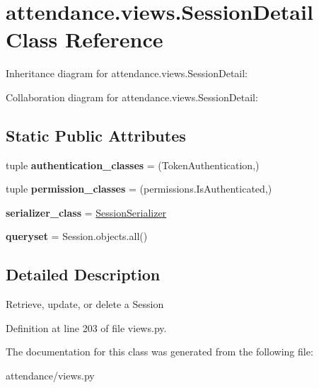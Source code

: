 \hypertarget{classattendance_1_1views_1_1_session_detail}{}\section{attendance.\+views.\+Session\+Detail Class Reference}
\label{classattendance_1_1views_1_1_session_detail}


Inheritance diagram for attendance.\+views.\+Session\+Detail\+:


Collaboration diagram for attendance.\+views.\+Session\+Detail\+:
\subsection*{Static Public Attributes}
\begin{DoxyCompactItemize}
\item 
\hypertarget{classattendance_1_1views_1_1_session_detail_add50980a6126e4108abdfcc8ae552d64}{}\label{classattendance_1_1views_1_1_session_detail_add50980a6126e4108abdfcc8ae552d64} 
tuple {\bfseries authentication\+\_\+classes} = (Token\+Authentication,)
\item 
\hypertarget{classattendance_1_1views_1_1_session_detail_ac02bcabc6d18ad907e1f832f013dd635}{}\label{classattendance_1_1views_1_1_session_detail_ac02bcabc6d18ad907e1f832f013dd635} 
tuple {\bfseries permission\+\_\+classes} = (permissions.\+Is\+Authenticated,)
\item 
\hypertarget{classattendance_1_1views_1_1_session_detail_aafa042242f9b8fddc8fa36bc0e90eac3}{}\label{classattendance_1_1views_1_1_session_detail_aafa042242f9b8fddc8fa36bc0e90eac3} 
{\bfseries serializer\+\_\+class} = \hyperlink{classattendance_1_1serializers_1_1_session_serializer}{Session\+Serializer}
\item 
\hypertarget{classattendance_1_1views_1_1_session_detail_a31eab3884081ee70d4ef8e1bf1c888f5}{}\label{classattendance_1_1views_1_1_session_detail_a31eab3884081ee70d4ef8e1bf1c888f5} 
{\bfseries queryset} = Session.\+objects.\+all()
\end{DoxyCompactItemize}


\subsection{Detailed Description}
\begin{DoxyVerb}Retrieve, update, or delete a Session
\end{DoxyVerb}
 

Definition at line 203 of file views.\+py.



The documentation for this class was generated from the following file\+:\begin{DoxyCompactItemize}
\item 
attendance/views.\+py\end{DoxyCompactItemize}
